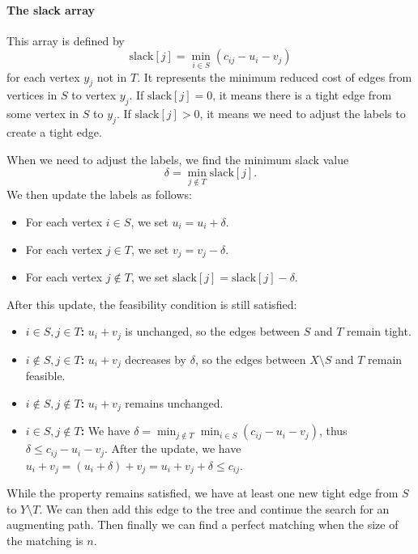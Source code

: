 \documentclass[acmsmall,nonacm]{acmart}
\theoremstyle{plain}
\theoremstyle{remark}
\begin{document}
\paragraph{The slack array} This array is defined by
\begin{equation}
    \label{eq:slack}
    \text{slack}[j] = \min_{i \in S} (c_{ij} - u_i - v_j)
\end{equation}
for each vertex $y_j$ not in $T$. It represents the minimum reduced cost of
edges from vertices in $S$ to vertex $y_j$. If $\text{slack}[j] = 0$, it means
there is a tight edge from some vertex in $S$ to $y_j$. If $\text{slack}[j] > 0$,
it means we need to adjust the labels to create a tight edge. 

When we need to adjust the labels, we find the minimum slack value
\begin{equation}
    \label{eq:delta}
    \delta = \min_{j \notin T} \text{slack}[j].
\end{equation}
We then update the labels as follows: 
\begin{itemize}
    \item For each vertex $i \in S$, we set $u_i = u_i + \delta$.
    \item For each vertex $j \in T$, we set $v_j = v_j - \delta$.
    \item For each vertex $j \notin T$, we set $\text{slack}[j] = \text{slack}[j] - \delta$.
\end{itemize}

After this update, the feasibility condition is still satisfied: 
\begin{itemize}
    \item \textbf{$i \in S, j \in T$:} $u_i + v_j$ is unchanged, so the edges between $S$ and $T$ remain tight. 
    \item \textbf{$i \notin S, j \in T$:} $u_i + v_j$ decreases by $\delta$, so the edges between $X \setminus S$ and $T$ remain feasible. 
    \item \textbf{$i \notin S, j \notin T$:} $u_i + v_j$ remains unchanged. 
    \item \textbf{$i\in S, j \notin T$:} We have $\delta = \min_{j \notin T} \min_{i \in S} (c_{ij} - u_i - v_j)$, thus $\delta \leq c_{ij} - u_i - v_j$. After the update, we have $u_i + v_j = (u_i + \delta) + v_j = u_i + v_j + \delta \leq c_{ij}$.
\end{itemize}

While the property remains satisfied, we have at least one new tight edge from $S$ to $Y \setminus T$. We can then add this edge to the tree and continue the search for an augmenting path. Then finally we can find a perfect matching when the size of the matching is $n$.
\end{document}

